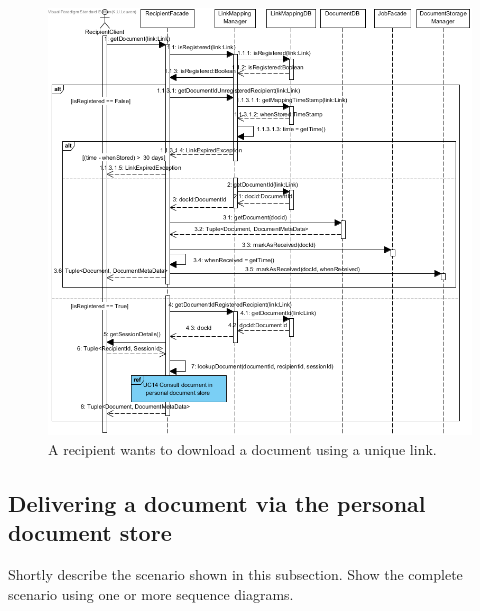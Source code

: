 \documentclass[a4paper,10pt]{article}
\begin{document}
\begin{figure}[!htp]
    \centering
    \includegraphics[width=\textwidth]{DownloadDocumentViaUniqueLink.png}
    \caption{A recipient wants to download a document using a unique link.
        }\label{fig:seq_DownloadDocumentViaUniqueLink}
\end{figure}





\subsection{Delivering a document via the personal document store}
\label{scenario:DeliverDocPDS}
Shortly describe the scenario shown in this subsection.
Show the complete scenario using one or more sequence diagrams.
\end{document}
